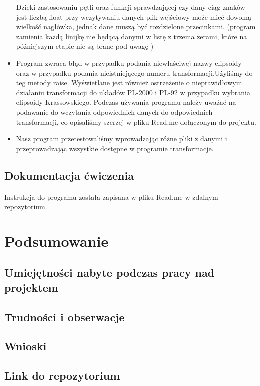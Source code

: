 \documentclass[10pt,a4paper]{article}
\begin{document}
\begin{itemize}
	Dzięki zastosowaniu pętli oraz funkcji sprawdzającej czy dany ciąg znaków jest liczbą float przy wczytywaniu danych plik wejściowy może mieć dowolną wielkość nagłówka, jednak dane muszą być rozdzielone przecinkami. (program zamienia każdą linijkę nie będącą danymi w listę z trzema zerami, które na późniejszym etapie nie są brane pod uwagę )
	\item Program zwraca błąd w przypadku podania niewłaściwej nazwy elipsoidy oraz w przypadku podania nieistniejącego numeru transformacji.Użyliśmy do teg metody raise. Wyświetlane jest również ostrzeżenie o nieprawidłowym działaniu transformacji do układów PL-2000 i PL-92 w przypadku wybrania elipsoidy Krassowskiego. Podczas używania programu należy uważać na podawanie do wczytania odpowiednich danych do odpowiednich transformacji, co opisaliśmy szerzej w pliku Read.me dołączonym do projektu.
	\item Nasz program przetestowaliśmy wprowadzając różne pliki z danymi i przeprowadzając wszystkie dostępne w programie transformacje.
\end{itemize}
\subsection{Dokumentacja ćwiczenia}
Instrukcja do programu została zapisana w pliku Read.me w zdalnym repozytorium.
\section{Podsumowanie}
\subsection{Umiejętności nabyte podczas pracy nad projektem}
\subsection{Trudności i obserwacje}
\subsection{Wnioski}
\subsection{Link do repozytorium}
\end{document}
